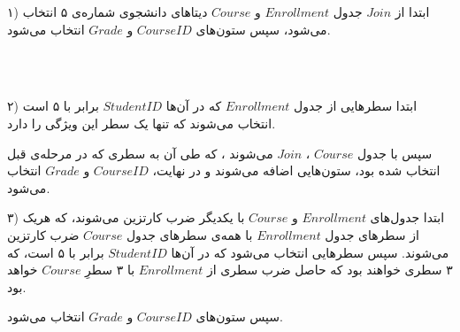 \bigbreak

۱) ابتدا از 
$Join$
جدول
$Enrollment$
و
$Course$
دیتاهای دانشجوی شماره‌ی ۵ انتخاب می‌شود، سپس ستون‌های 
$CourseID$
و
$Grade$
انتخاب می‌شود.

\bigbreak
\\
\\

\begin{LTRbibitems}
\end{LTRbibitems}



۲)
ابتدا سطرهایی از جدول
$Enrollment$
که در آن‌ها
$StudentID$
برابر با ۵ است انتخاب می‌شوند که تنها یک سطر این ویژگی را دارد.

سپس
 با جدول
$Course$ 
،
$Join$
می‌شوند
،
که طی آن به سطری که در مرحله‌ی قبل انتخاب شده بود، ستون‌هایی اضافه می‌شوند و در نهایت،
$CourseID$
و
$Grade$
انتخاب می‌شود.

\bigbreak

\begin{LTRbibitems}
\end{LTRbibitems}

\bigbreak
۳)
ابتدا جدول‌های 
$Enrollment$
و
$Course$
با یکدیگر ضرب کارتزین می‌شوند، که هریک از سطرهای جدول
$Enrollment$
با همه‌ی سطرهای جدول
$Course$
ضرب کارتزین می‌شوند.
سپس سطرهایی انتخاب می‌شود که در آن‌ها
$StudentID$
برابر با ۵ است،
که ۳ سطری خواهند بود که حاصل ضرب سطری از
$Enrollment$
با ۳ سطرِ 
$Course$
خواهد بود.

سپس ستون‌های
$CourseID$
و
$Grade$
انتخاب می‌شود.

\bigbreak

\begin{LTRbibitems}
\end{LTRbibitems}

